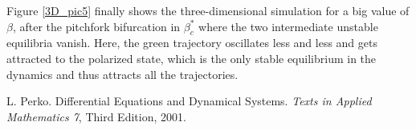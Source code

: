 \documentclass[a4paper,10pt,leqno]{amsart}
\theoremstyle{plain}
\begin{document}
Figure \ref{3D_pic5} finally shows the three-dimensional simulation for a big value of $\beta$, after the pitchfork bifurcation in $\beta^*_c$ where the two intermediate unstable equilibria vanish. Here, the green trajectory oscillates less and less and gets attracted to the polarized state, which is the only stable equilibrium in the dynamics and thus attracts all the trajectories.







\begin{thebibliography}{9}

L. Perko.
\newblock Differential Equations and Dynamical Systems.
\newblock \emph{Texts in Applied Mathematics 7}, Third Edition, 2001.

\end{thebibliography}
\end{document}
